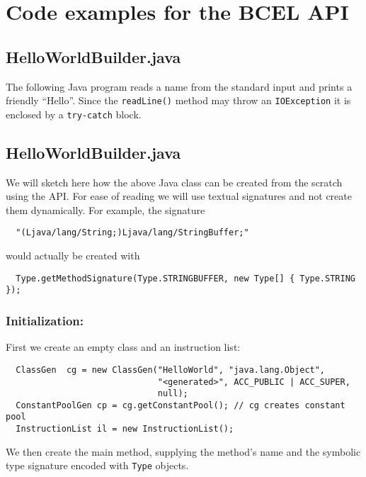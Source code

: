 \section{Code examples for the BCEL API}\label{sec:apicg}

\subsection{HelloWorldBuilder.java}
The following Java program reads a name from the standard input and
prints a friendly ``Hello''. Since the \texttt{readLine()} method may
throw an \texttt{IOException} it is enclosed by a \texttt{try-catch} block.

{\small {}\label{sec:hello}}

\subsection{HelloWorldBuilder.java}

We will sketch  here how the above Java class can  be created from the
scratch  using the \jc API. For ease of reading we will
use textual signatures and not create them dynamically. For example,
the signature

\begin{verbatim}
  "(Ljava/lang/String;)Ljava/lang/StringBuffer;"
\end{verbatim}

would actually be created with

\begin{verbatim}
  Type.getMethodSignature(Type.STRINGBUFFER, new Type[] { Type.STRING });
\end{verbatim}

\subsubsection{Initialization:}

First we create an empty class and an instruction list:

{\small\begin{verbatim}
  ClassGen  cg = new ClassGen("HelloWorld", "java.lang.Object",
                              "<generated>", ACC_PUBLIC | ACC_SUPER,
                              null);
  ConstantPoolGen cp = cg.getConstantPool(); // cg creates constant pool
  InstructionList il = new InstructionList();
\end{verbatim}}

We then create the main method, supplying the method's name and the
symbolic type signature encoded with \texttt{Type} objects.

